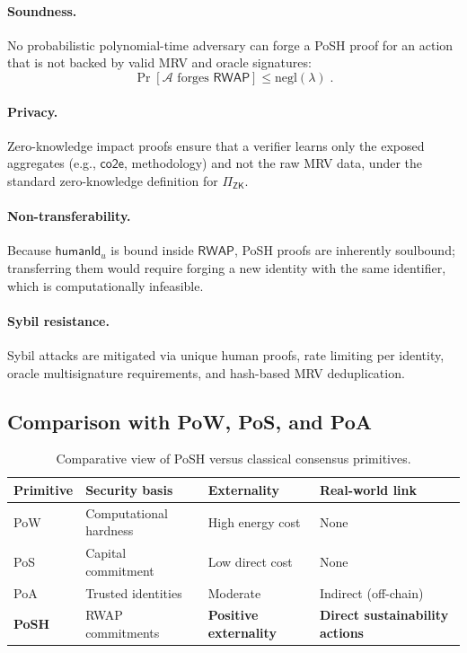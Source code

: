 \documentclass[11pt,a4paper]{report}
\theoremstyle{definition}
\theoremstyle{remark}
\begin{document}
\paragraph{Soundness.}
No probabilistic polynomial-time adversary can forge a PoSH proof for an action
that is not backed by valid MRV and oracle signatures:
\[
  \Pr[\mathcal{A} \text{ forges } \mathsf{RWAP}] \leq \text{negl}(\lambda) \; .
\]

\paragraph{Privacy.}
Zero-knowledge impact proofs ensure that a verifier learns only the exposed
aggregates (e.g., \(\mathsf{co2e}\), methodology) and not the raw MRV data,
under the standard zero-knowledge definition for \(\Pi_{\textsf{ZK}}\).

\paragraph{Non-transferability.}
Because \(\mathsf{humanId}_u\) is bound inside \(\mathsf{RWAP}\), PoSH proofs
are inherently soulbound; transferring them would require forging a new identity
with the same identifier, which is computationally infeasible.

\paragraph{Sybil resistance.}
Sybil attacks are mitigated via unique human proofs, rate limiting per identity,
oracle multisignature requirements, and hash-based MRV deduplication.

\subsection{Comparison with PoW, PoS, and PoA}

\begin{table}[h!]
  \centering
  \begin{tabular}{p{2cm}p{3cm}p{3cm}p{3cm}}
    \hline
    Primitive & Security basis & Externality & Real-world link \\
    \hline
    PoW & Computational hardness & High energy cost & None \\
    PoS & Capital commitment & Low direct cost & None \\
    PoA & Trusted identities & Moderate & Indirect (off-chain) \\
    \textbf{PoSH} & RWAP commitments & \textbf{Positive externality} & \textbf{Direct sustainability actions} \\
    \hline
  \end{tabular}
  \caption{Comparative view of PoSH versus classical consensus primitives.}
\end{table}
\end{document}

